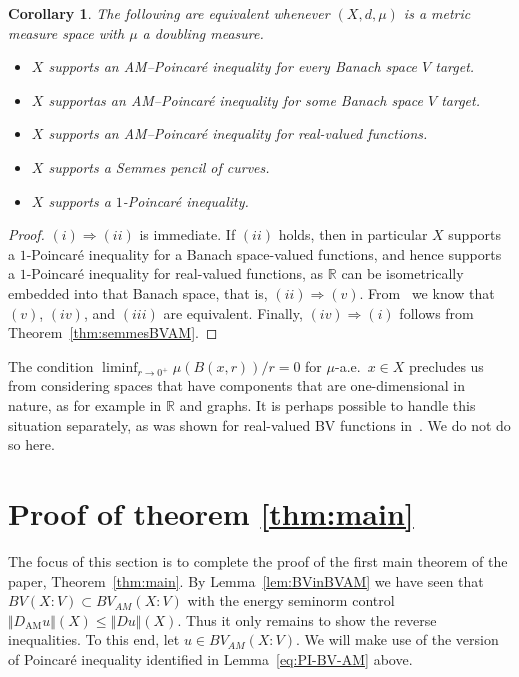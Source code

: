 \documentclass[11pt, letterpaper]{amsart} %
\newcommand*{\R}{{\mathbb R}}
\numberwithin{equation}{section}
\theoremstyle{plain}
\newtheorem{corollary}[equation]{Corollary}
\theoremstyle{definition}
\begin{document}
{\begin{corollary}\label{cor:Poincare}
The following are equivalent whenever $(X,d,\mu )$ is a metric measure space with $\mu$ a doubling measure.
\begin{itemize}
\item[$(i)$] $X$ supports an AM--Poincar\'e inequality for every Banach space $V$ target.
\item[$(ii)$] $X$ supportas an AM--Poincar\'e inequality for some Banach space $V$ target.
\item[$(iii)$] $X$ supports an AM--Poincar\'e inequality for real-valued functions.
\item[$(iv)$] $X$ supports a Semmes pencil of curves.
\item[$(v)$] $X$ supports a $1$-Poincar\'e inequality.
\end{itemize}
\end{corollary}

\begin{proof}
$(i)\Rightarrow (ii)$ is immediate. If $(ii)$ holds, then in particular $X$ supports a 
$1$-Poincaré inequality for a Banach space-valued functions, and hence
supports a $1$-Poincar\'e inequality for real-valued functions, as $\R$ can be isometrically embedded
into that Banach space, that is, $(ii)\Rightarrow (v)$.
From~\cite[Theorem~3.10]{DEKS} we know that $(v)$, $(iv)$, and $(iii)$ are equivalent.
Finally, $(iv)\Rightarrow (i)$ 
follows from Theorem~\ref{thm:semmesBVAM}.
\end{proof}

The condition $\liminf_{r\to 0^+}\mu(B(x,r))/r=0$ for $\mu$-a.e.~$x\in X$ precludes us from considering spaces that
have components that are one-dimensional in nature, as for example in $\R$ and graphs. It is perhaps possible to handle 
this situation separately, as was shown for real-valued BV functions in~\cite{LZ}. We do not do so here.


\section{Proof of theorem \ref{thm:main}}\label{Sec:4}

The focus of this section is to complete the proof of the first main theorem of the paper, Theorem~\ref{thm:main}.
By Lemma~\ref{lem:BVinBVAM} we have seen that $BV(X:V)\subset BV_{AM}(X:V)$ with the energy seminorm control
$\Vert D_\mathrm{AM}u\Vert (X)\leq\Vert Du\Vert (X)$. Thus it only remains to show the reverse inequalities.
To this end, let $u\in BV_{AM}(X:V)$. We will make use of the version of Poincar\'e inequality identified in
Lemma~\ref{eq:PI-BV-AM} above.

}
\end{document}

